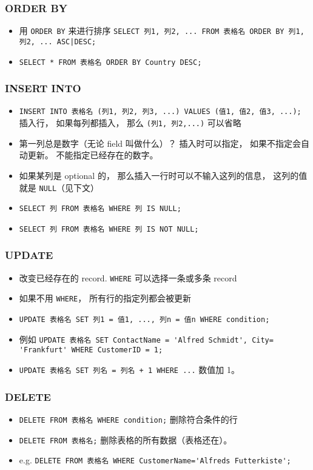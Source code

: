 \subsubsection{ORDER BY}
\begin{itemize}
\item 用 \verb`ORDER BY` 来进行排序 \verb`SELECT 列1, 列2, ... FROM 表格名 ORDER BY 列1, 列2, ... ASC|DESC;`
\item \verb`SELECT * FROM 表格名 ORDER BY Country DESC;`
\end{itemize}

\subsubsection{INSERT INTO}
\begin{itemize}
\item \verb`INSERT INTO 表格名 (列1, 列2, 列3, ...) VALUES (值1, 值2, 值3, ...);` 插入行， 如果每列都插入， 那么 \verb`(列1, 列2,...)` 可以省略
\item 第一列总是数字（无论 field 叫做什么）？ 插入时可以指定，  如果不指定会自动更新。 不能指定已经存在的数字。
\item 如果某列是 optional 的， 那么插入一行时可以不输入这列的信息， 这列的值就是 \verb`NULL`（见下文）
\item \verb`SELECT 列 FROM 表格名 WHERE 列 IS NULL;`
\item \verb`SELECT 列 FROM 表格名 WHERE 列 IS NOT NULL;`
\end{itemize}

\subsubsection{UPDATE}
\begin{itemize}
\item 改变已经存在的 record. \verb|WHERE| 可以选择一条或多条 record
\item 如果不用 \verb`WHERE`， 所有行的指定列都会被更新
\item \verb`UPDATE 表格名 SET 列1 = 值1, ..., 列n = 值n WHERE condition;`
\item 例如 \verb`UPDATE 表格名 SET ContactName = 'Alfred Schmidt', City= 'Frankfurt' WHERE CustomerID = 1;`
\item \verb|UPDATE 表格名 SET 列名 = 列名 + 1 WHERE ...| 数值加 1。
\end{itemize}

\subsubsection{DELETE}
\begin{itemize}
\item \verb`DELETE FROM 表格名 WHERE condition;` 删除符合条件的行
\item \verb|DELETE FROM 表格名;| 删除表格的所有数据（表格还在）。
\item e.g. \verb`DELETE FROM 表格名 WHERE CustomerName='Alfreds Futterkiste';`
\end{itemize}

